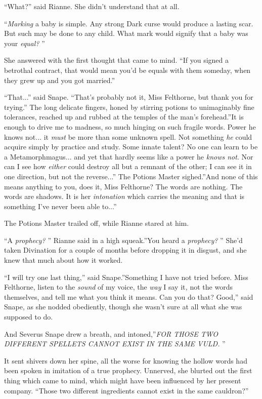 ``What?'' said Rianne. She didn't understand that at all.

``\emph{Marking} a baby is simple. Any strong Dark curse would produce a
lasting scar. But such may be done to any child. What mark would signify
that a baby was your \emph{equal?} ''

She answered with the first thought that came to mind. ``If you signed a
betrothal contract, that would mean you'd be equals with them someday,
when they grew up and you got married.''

``That...'' said Snape. ``That's probably not it, Miss Felthorne,
but thank you for trying.'' The long delicate fingers, honed by stirring
potions to unimaginably fine tolerances, reached up and rubbed at the
temples of the man's forehead.''It is enough to drive me to madness, so
much hinging on such fragile words. Power he knows not... it
\emph{must} be more than some unknown spell. Not something \emph{he}
could acquire simply by practice and study. Some innate talent? No one
can learn to be a Metamorphmagus... and yet that hardly seems like
a power he \emph{knows not}. Nor can I see how \emph{either} could
destroy all but a remnant of the other; I can see it in one direction,
but not the reverse...'' The Potions Master sighed.''And none of
this means anything to you, does it, Miss Felthorne? The words are
nothing. The words are shadows. It is her \emph{intonation} which
carries the meaning and that is something I've never been able
to...''

The Potions Master trailed off, while Rianne stared at him.

``A \emph{prophecy?} '' Rianne said in a high squeak.''You heard a
\emph{prophecy?} '' She'd taken Divination for a couple of months before
dropping it in disgust, and she knew that much about how it worked.

``I will try one last thing,'' said Snape.''Something I have not tried
before. Miss Felthorne, listen to the \emph{sound} of my voice, the
\emph{way} I say it\emph{,} not the words themselves, and tell me what
you think it means. Can you do that? Good,'' said Snape, as she nodded
obediently, though she wasn't sure at all what she was supposed to do.

And Severus Snape drew a breath, and intoned,''\emph{FOR THOSE TWO
DIFFERENT SPELLETS CANNOT EXIST IN THE SAME VULD.} ''

It sent shivers down her spine, all the worse for knowing the hollow
words had been spoken in imitation of a true prophecy. Unnerved, she
blurted out the first thing which came to mind, which might have been
influenced by her present company. ``Those two different ingredients
cannot exist in the same cauldron?''

